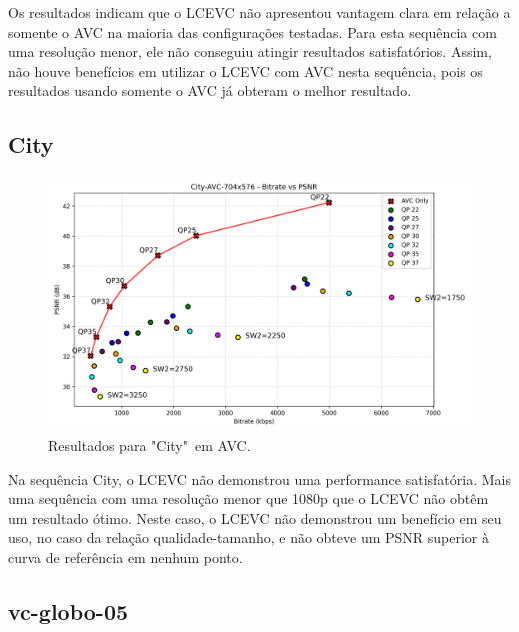 Os resultados indicam que o \acrshort{LCEVC} não apresentou vantagem clara em relação
a somente o \acrshort{AVC} na maioria das configurações testadas. Para esta sequência 
com uma resolução menor, ele não conseguiu atingir resultados satisfatórios. Assim,
não houve benefícios em utilizar o \acrshort{LCEVC} com \acrshort{AVC} nesta sequência,
pois os resultados usando somente o \acrshort{AVC} já obteram o melhor resultado.  

\newpage
\subsection{City}

\begin{figure}[h]
    \centering
    \includegraphics[width=1.0\textwidth]{img/City-AVC.png}
    \caption{Resultados para "City"\ em \acrshort{AVC}. \cite{xiph}}
    \label{fig:City}
\end{figure}

Na sequência City, o \acrshort{LCEVC} não demonstrou uma performance satisfatória. Mais 
uma sequência com uma resolução menor que 1080p que o \acrshort{LCEVC} não obtêm um resultado
ótimo. Neste caso, o \acrshort{LCEVC} não demonstrou um benefício em seu uso, no caso da relação
qualidade-tamanho, e não obteve um \acrshort{PSNR} superior à curva de referência em nenhum ponto.

\newpage
\subsection{vc-globo-05}


